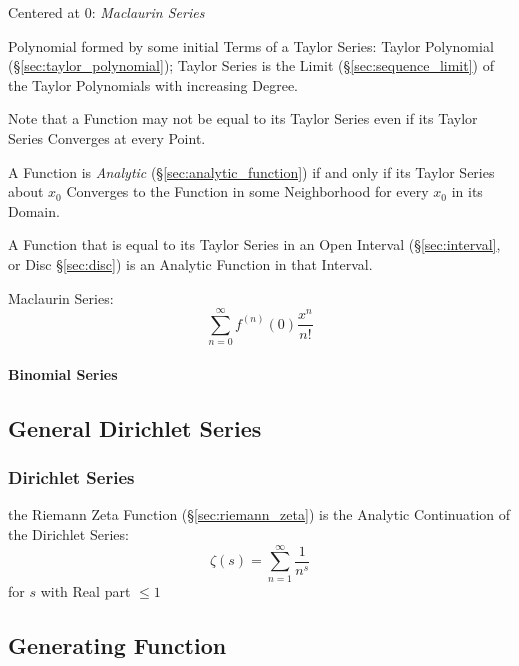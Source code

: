 Centered at $0$: \emph{Maclaurin Series}

Polynomial formed by some initial Terms of a Taylor Series: Taylor
Polynomial (\S\ref{sec:taylor_polynomial}); Taylor Series is the Limit
(\S\ref{sec:sequence_limit}) of the Taylor Polynomials with increasing
Degree.

Note that a Function may not be equal to its Taylor Series even if its
Taylor Series Converges at every Point.

A Function is \emph{Analytic} (\S\ref{sec:analytic_function}) if and only if
its Taylor Series about $x_0$ Converges to the Function in some Neighborhood
for every $x_0$ in its Domain.

A Function that is equal to its Taylor Series in an Open Interval
(\S\ref{sec:interval}, or Disc \S\ref{sec:disc}) is an Analytic Function in
that Interval.

Maclaurin Series:
\[
  \sum_{n=0}^\infty f^{(n)}(0) \frac{x^n}{n!}
\]



\paragraph{Binomial Series}\label{sec:binomial_series}\hfill



\subsection{General Dirichlet Series}\label{sec:general_dirichlet}




\subsubsection{Dirichlet Series}\label{sec:dirichlet_series}

the Riemann Zeta Function (\S\ref{sec:riemann_zeta}) is the Analytic
Continuation of the Dirichlet Series:
\[
  \zeta(s) = \sum_{n=1}^\infty \frac{1}{n^s}
\]
for $s$ with Real part $\leq 1$



\subsection{Generating Function}\label{sec:generating_function}

